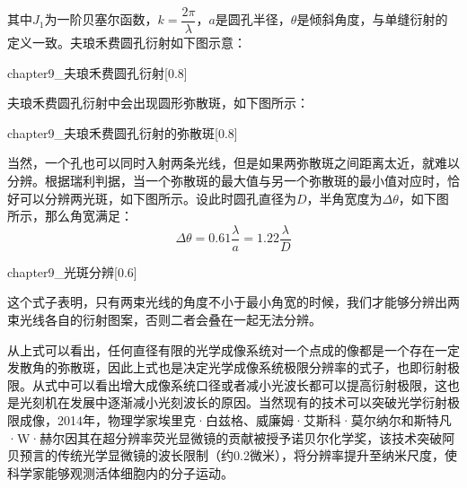 其中$J_1$为一阶贝塞尔函数，$k = \dfrac{2\pi}{\lambda}$，$a$是圆孔半径，$\theta$是倾斜角度，与单缝衍射的定义一致。夫琅禾费圆孔衍射如下图示意：
\begin{singlefigure}[夫琅禾费圆孔衍射]{chapter9_夫琅禾费圆孔衍射}[0.8]
\end{singlefigure}

夫琅禾费圆孔衍射中会出现圆形弥散斑，如下图所示：
\begin{singlefigure}[夫琅禾费圆孔衍射的弥散斑]{chapter9_夫琅禾费圆孔衍射的弥散斑}[0.8]
\end{singlefigure}

当然，一个孔也可以同时入射两条光线，但是如果两弥散斑之间距离太近，就难以分辨。根据瑞利判据，当一个弥散斑的最大值与另一个弥散斑的最小值对应时，恰好可以分辨两光斑，如下图所示。设此时圆孔直径为$D$，半角宽度为$\Delta\theta$，如下图所示，那么角宽满足：
\[\Delta\theta = 0.61\dfrac{\lambda}{a} = 1.22\dfrac{\lambda}{D}\]

\begin{singlefigure}[光斑分辨]{chapter9_光斑分辨}[0.6]
\end{singlefigure}

这个式子表明，只有两束光线的角度不小于最小角宽的时候，我们才能够分辨出两束光线各自的衍射图案，否则二者会叠在一起无法分辨。

从上式可以看出，任何直径有限的光学成像系统对一个点成的像都是一个存在一定发散角的弥散斑，因此上式也是决定光学成像系统极限分辨率的式子，也即衍射极限。从式中可以看出增大成像系统口径或者减小光波长都可以提高衍射极限，这也是光刻机在发展中逐渐减小光刻波长的原因。当然现有的技术可以突破光学衍射极限成像，2014年，物理学家埃里克·白兹格、威廉姆·艾斯科·莫尔纳尔和斯特凡·W·赫尔因其在超分辨率荧光显微镜的贡献被授予诺贝尔化学奖，该技术突破阿贝预言的传统光学显微镜的波长限制（约0.2微米），将分辨率提升至纳米尺度，使科学家能够观测活体细胞内的分子运动。
\section[多缝衍射]{}
